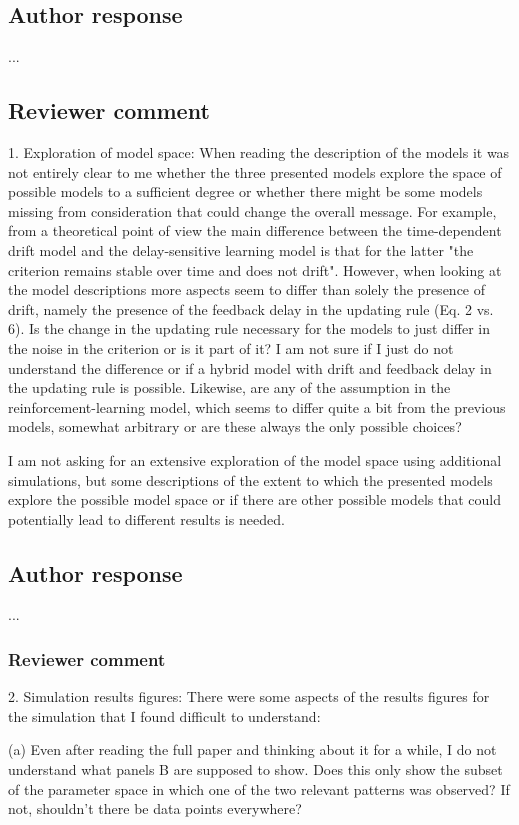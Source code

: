 \documentclass[12pt]{article}
\begin{document}
\subsection{Author response}
...

\subsection{Reviewer comment}
1. Exploration of model space: When reading the description
of the models it was not entirely clear to me whether the
three presented models explore the space of possible models
to a sufficient degree or whether there might be some models
missing from consideration that could change the overall
message. For example, from a theoretical point of view the
main difference between the time-dependent drift model and
the delay-sensitive learning model is that for the latter
"the criterion remains stable over time and does not drift".
However, when looking at the model descriptions more aspects
seem to differ than solely the presence of drift, namely the
presence of the feedback delay in the updating rule (Eq. 2
vs. 6). Is the change in the updating rule necessary for the
models to just differ in the noise in the criterion or is it
part of it? I am not sure if I just do not understand the
difference or if a hybrid model with drift and feedback
delay in the updating rule is possible. Likewise, are any of
the assumption in the reinforcement-learning model, which
seems to differ quite a bit from the previous models,
somewhat arbitrary or are these always the only possible
choices?

I am not asking for an extensive exploration of the model
space using additional simulations, but some descriptions of
the extent to which the presented models explore the
possible model space or if there are other possible models
that could potentially lead to different results is needed.

\subsection{Author response}
...

\subsubsection{Reviewer comment}
2. Simulation results figures: There were some aspects of
the results figures for the simulation that I found
difficult to understand:

(a) Even after reading the full paper and thinking about it
for a while, I do not understand what panels B are supposed
to show. Does this only show the subset of the parameter
space in which one of the two relevant patterns was
observed? If not, shouldn't there be data points everywhere?
\end{document}
